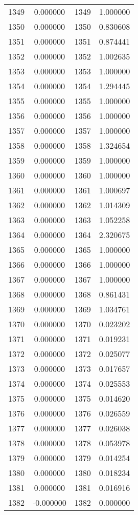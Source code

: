 \documentclass[12pt]{article}
\begin{document}
\begin{longtable}{@{}cccc@{}}
1349 & 0.000000 & 1349 & 1.000000 \\
1350 & 0.000000 & 1350 & 0.830608 \\
1351 & 0.000000 & 1351 & 0.874441 \\
1352 & 0.000000 & 1352 & 1.002635 \\
1353 & 0.000000 & 1353 & 1.000000 \\
1354 & 0.000000 & 1354 & 1.294445 \\
1355 & 0.000000 & 1355 & 1.000000 \\
1356 & 0.000000 & 1356 & 1.000000 \\
1357 & 0.000000 & 1357 & 1.000000 \\
1358 & 0.000000 & 1358 & 1.324654 \\
1359 & 0.000000 & 1359 & 1.000000 \\
1360 & 0.000000 & 1360 & 1.000000 \\
1361 & 0.000000 & 1361 & 1.000697 \\
1362 & 0.000000 & 1362 & 1.014309 \\
1363 & 0.000000 & 1363 & 1.052258 \\
1364 & 0.000000 & 1364 & 2.320675 \\
1365 & 0.000000 & 1365 & 1.000000 \\
1366 & 0.000000 & 1366 & 1.000000 \\
1367 & 0.000000 & 1367 & 1.000000 \\
1368 & 0.000000 & 1368 & 0.861431 \\
1369 & 0.000000 & 1369 & 1.034761 \\
1370 & 0.000000 & 1370 & 0.023202 \\
1371 & 0.000000 & 1371 & 0.019231 \\
1372 & 0.000000 & 1372 & 0.025077 \\
1373 & 0.000000 & 1373 & 0.017657 \\
1374 & 0.000000 & 1374 & 0.025553 \\
1375 & 0.000000 & 1375 & 0.014620 \\
1376 & 0.000000 & 1376 & 0.026559 \\
1377 & 0.000000 & 1377 & 0.026038 \\
1378 & 0.000000 & 1378 & 0.053978 \\
1379 & 0.000000 & 1379 & 0.014254 \\
1380 & 0.000000 & 1380 & 0.018234 \\
1381 & 0.000000 & 1381 & 0.016916 \\
1382 & -0.000000 & 1382 & 0.000000 \\

\end{longtable}
\end{document}
